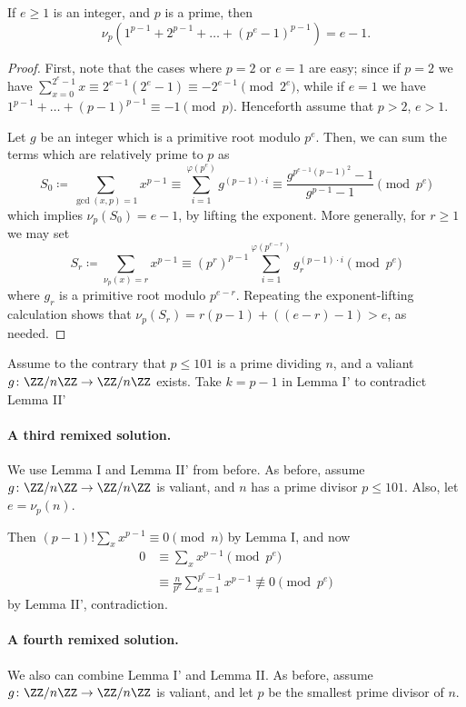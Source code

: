 \documentclass[11pt]{scrartcl}
\begin{document}
\begin{lemma*}
  [Lemma II']
  If $e \ge 1$ is an integer,
  and $p$ is a prime, then
  \[ \nu_p\left( 1^{p-1} + 2^{p-1} + \dots + (p^e-1)^{p-1}  \right)
    = e-1. \]
\end{lemma*}
\begin{proof}
  First, note that the cases where $p = 2$ or $e = 1$
  are easy; since if $p = 2$ we have
  $\sum_{x = 0}^{2^e - 1} x \equiv 2^{e - 1}(2^e - 1)
    \equiv -2^{e - 1}\pmod{2^e}$,
  while if $e = 1$ we have $1^{p-1} + \dots + (p-1)^{p-1} \equiv -1 \pmod p$.
  Henceforth assume that $p > 2$, $e > 1$.

  Let $g$ be an integer which is a primitive root modulo $p^e$.
  Then, we can sum the terms which are relatively prime to $p$ as
  \[ S_0 \coloneqq \sum_{\gcd(x,p) = 1} x^{p-1}
    \equiv \sum_{i=1}^{\varphi(p^e)} g^{(p-1) \cdot i}
    \equiv \frac{g^{p^{e-1}(p-1)^2} - 1}{g^{p-1}-1}
    \pmod{p^e}
  \]
  which implies $\nu_p(S_0) = e-1$, by lifting the exponent.
  More generally, for $r \ge 1$ we may set
  \[ S_r \coloneqq \sum_{\nu_p(x) = r} x^{p-1}
    \equiv (p^r)^{p-1} \sum_{i=1}^{\varphi(p^{e-r})}
      g_r^{(p-1) \cdot i}
    \pmod{p^e}
  \]
  where $g_r$ is a primitive root modulo $p^{e-r}$.
  Repeating the exponent-lifting calculation
  shows that $\nu_p(S_r) = r(p-1) + \left( (e-r)-1 \right) > e$,
  as needed.
\end{proof}

Assume to the contrary that $p \le 101$ is a prime dividing
$n$, and a valiant $g \colon \ZZ / n \ZZ \to \ZZ / n \ZZ$ exists.
Take $k = p-1$ in Lemma I' to contradict Lemma II'

\paragraph{A third remixed solution.}
We use Lemma I and Lemma II' from before.
As before, assume $g \colon \ZZ / n \ZZ \to \ZZ / n \ZZ$ is valiant,
and $n$ has a prime divisor $p \le 101$.
Also, let $e = \nu_p(n)$.

Then $(p-1)! \sum_x x^{p-1} \equiv 0 \pmod{n}$ by Lemma I,
and now
\begin{align*}
  0 & \equiv \sum_x x^{p-1} \pmod{p^e} \\
  &\equiv \frac{n}{p^e} \sum_{x=1}^{p^e-1} x^{p-1} \not\equiv 0 \pmod{p^e}
\end{align*}
by Lemma II', contradiction.

\paragraph{A fourth remixed solution.}
We also can combine Lemma I' and Lemma II.
As before, assume $g \colon \ZZ / n \ZZ \to \ZZ / n \ZZ$ is valiant,
and let $p$ be the smallest prime divisor of $n$.
\end{document}
